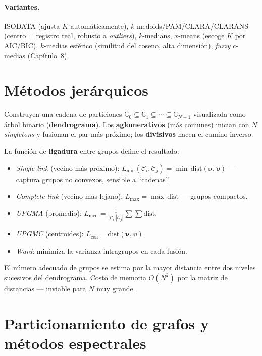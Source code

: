 \paragraph{Variantes.} ISODATA (ajusta $K$ automáticamente),
$k$-medoids/PAM/CLARA/CLARANS (centro = registro real, robusto a
\emph{outliers}), $k$-medians, $x$-means (escoge $K$ por AIC/BIC),
$k$-medias esférico (similitud del coseno, alta dimensión),
\emph{fuzzy} $c$-medias (Capítulo~8).

\section{Métodos jerárquicos}

Construyen una cadena de particiones
$\mathbb{C}_0\subseteq\mathbb{C}_1\subseteq\cdots\subseteq\mathbb{C}_{N-1}$
visualizada como árbol binario (\textbf{dendrograma}). Los
\textbf{aglomerativos} (más comunes) inician con $N$ \emph{singletons}
y fusionan el par más próximo; los \textbf{divisivos} hacen el camino
inverso.

La función de \textbf{ligadura} entre grupos define el resultado:
\begin{itemize}[leftmargin=1.2cm]
  \item \emph{Single-link} (vecino más próximo):
        $L_{\min}(\mathcal{C}_i,\mathcal{C}_j)=\min\,\mathrm{dist}(\boldsymbol\nu,\boldsymbol\upsilon)$
        --- captura grupos no convexos, sensible a ``cadenas''.
  \item \emph{Complete-link} (vecino más lejano):
        $L_{\max}=\max\,\mathrm{dist}$ --- grupos compactos.
  \item \emph{UPGMA} (promedio):
        $L_{\mathrm{med}}=\frac{1}{|\mathcal{C}_i||\mathcal{C}_j|}\sum\sum\mathrm{dist}$.
  \item \emph{UPGMC} (centroides):
        $L_{\mathrm{cen}}=\mathrm{dist}(\bar{\boldsymbol\nu},\bar{\boldsymbol\upsilon})$.
  \item \emph{Ward}: minimiza la varianza intragrupos en cada fusión.
\end{itemize}
El número adecuado de grupos se estima por la mayor distancia entre
dos niveles sucesivos del dendrograma. Costo de memoria $O(N^2)$ por
la matriz de distancias --- inviable para $N$ muy grande.

\section{Particionamiento de grafos y métodos espectrales}

